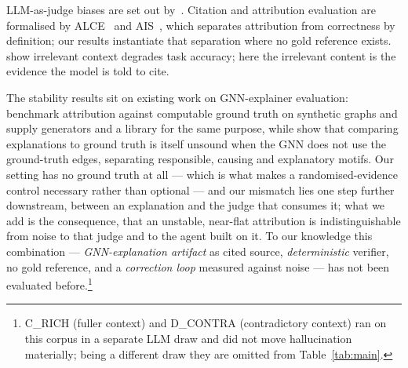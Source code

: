 \documentclass{article}
\begin{document}
LLM-as-judge biases are set out by~\citet{zheng2023judging}.
Citation and attribution evaluation are formalised by ALCE~\citep{gao2023alce} and
AIS~\citep{rashkin2023ais}, which separates attribution from correctness by
definition; our results instantiate that separation where no gold reference exists.
\citet{shi2023distracted} show irrelevant context degrades task accuracy; here the
irrelevant content is the evidence the model is told to cite.

The stability results sit on existing work on GNN-explainer evaluation:
\citet{sanchez2020evaluating} benchmark attribution against computable ground truth
on synthetic graphs and \citet{agarwal2023evaluating} supply generators and a library
for the same purpose, while \citet{faber2021ground} show that comparing explanations
to ground truth is itself unsound when the GNN does not use the ground-truth edges,
separating responsible, causing and explanatory motifs. Our setting has no ground
truth at all --- which is what makes a randomised-evidence control necessary rather
than optional --- and our mismatch lies one step further downstream, between an
explanation and the judge that consumes it; what we add is the consequence, that an
unstable, near-flat attribution is indistinguishable from noise to that judge and to
the agent built on it.
To our knowledge this combination --- \emph{GNN-explanation artifact}
as cited source, \emph{deterministic} verifier, no gold reference, and a
\emph{correction loop} measured against noise --- has not been evaluated before.\footnote{C\_RICH (fuller context) and D\_CONTRA (contradictory context) ran on
this corpus in a separate LLM draw and did not move hallucination materially; being
a different draw they are omitted from Table~\ref{tab:main}.}
\end{document}
